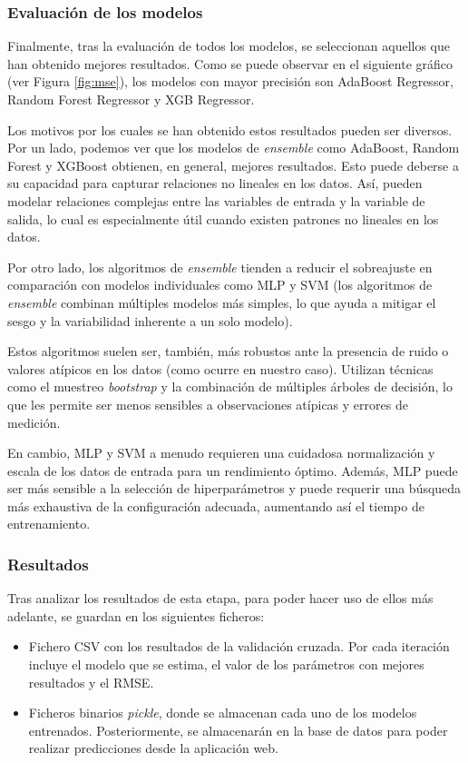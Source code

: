 \subsubsection{Evaluación de los modelos}
Finalmente, tras la evaluación de todos los modelos, se seleccionan aquellos que han obtenido mejores resultados. Como se puede observar en el siguiente gráfico (ver Figura \ref{fig:mse}), los modelos con mayor precisión son AdaBoost Regressor, Random Forest Regressor y XGB Regressor.


Los motivos por los cuales se han obtenido estos resultados pueden ser diversos. Por un lado, podemos ver que los modelos de \textit{ensemble} como AdaBoost, Random Forest y XGBoost obtienen, en general, mejores resultados. Esto puede deberse a su capacidad para capturar relaciones no lineales en los datos. Así, pueden modelar relaciones complejas entre las variables de entrada y la variable de salida, lo cual es especialmente útil cuando existen patrones no lineales en los datos. 

Por otro lado, los algoritmos de \textit{ensemble} tienden a reducir el sobreajuste en comparación con modelos individuales como MLP y SVM (los algoritmos de \textit{ensemble} combinan múltiples modelos más simples, lo que ayuda a mitigar el sesgo y la variabilidad inherente a un solo modelo).

Estos algoritmos suelen ser, también, más robustos ante la presencia de ruido o valores atípicos en los datos (como ocurre en nuestro caso). Utilizan técnicas como el muestreo \textit{bootstrap} y la combinación de múltiples árboles de decisión, lo que les permite ser menos sensibles a observaciones atípicas y errores de medición.

En cambio, MLP y SVM a menudo requieren una cuidadosa normalización y escala de los datos de entrada para un rendimiento óptimo. Además, MLP puede ser más sensible a la selección de hiperparámetros y puede requerir una búsqueda más exhaustiva de la configuración adecuada, aumentando así el tiempo de entrenamiento.

\subsubsection{Resultados}
Tras analizar los resultados de esta etapa, para poder hacer uso de ellos más adelante, se guardan en los siguientes ficheros:
\begin{itemize}
    \item Fichero CSV con los resultados de la validación cruzada. Por cada iteración incluye el modelo que se estima, el valor de los parámetros con mejores resultados y el RMSE.
    \item Ficheros binarios \textit{pickle}, donde se almacenan cada uno de los modelos entrenados. Posteriormente, se almacenarán en la base de datos para poder realizar predicciones desde la aplicación web.
\end{itemize}


